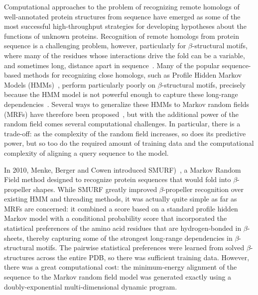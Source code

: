 \documentclass[blockstyle,times,preprint]{sigplanconf}
\begin{document}
Computational approaches to the problem of recognizing remote homologs of
well-annotated protein structures from sequence have emerged as some of the most
successful high-throughput strategies for developing hypotheses about the
functions of unknown proteins.
Recognition of remote homologs from protein sequence is a challenging problem,
however, particularly for $\beta$-structural motifs, where many of the
residues whose interactions drive the fold can be a variable, and sometimes
long, distance apart in sequence~\cite{Menke:2010ti}. 
Many of the popular
sequence-based methods for recognizing close homologs, such as Profile
Hidden Markov Models (HMMs)~\cite{Eddy:1998ut,Hughey:1996ub}, perform 
particularly poorly on
$\beta$-structural motifs, precisely because the HMM model is not
powerful enough to capture these long-range 
dependencies~\cite{Lifson:1980vd, Zhu:1999wr, Olmea:1999ug, 
Cowen:2002p588,Steward:2002wz}. 
Several ways
to generalize these HMMs to Markov random fields (MRFs) have therefore
been 
proposed~\cite{White:1994ty, Lathrop:1996gm, Thomas:2008uw, 
Gopalakrishnan:2009wx, Menke:2010ti, Peng:2011vk}, but with the additional 
power of the 
random field comes several computational challenges. 
In particular, there is a trade-off: as the complexity of the random field
increases, so does its predictive power, but so too do the required amount of 
training data and the computational complexity of aligning a query sequence
to the model.

In 2010, Menke, Berger and Cowen introduced
SMURF)~\cite{Menke:2010ti}, a Markov Random Field method designed to
recognize protein sequences that would fold into $\beta$-propeller
shapes. 
While SMURF greatly improved $\beta$-propeller recognition over
existing HMM and threading methods, it was actually quite simple as
far as MRFs are concerned: it combined a score based on a standard profile 
hidden Markov model with a conditional probability score that incorporated
the statistical preferences of the amino acid residues that are
hydrogen-bonded in $\beta$-sheets, thereby capturing some of the
strongest long-range dependencies in $\beta$-structural motifs.
The
pairwise statistical preferences were learned from solved
$\beta$-structures across the entire PDB, so there was sufficient
training data. 
However, there was a great computational cost: the
minimum-energy alignment of the sequence to the Markov random field model
was generated exactly using a doubly-exponential multi-dimensional
dynamic program.
\end{document}
